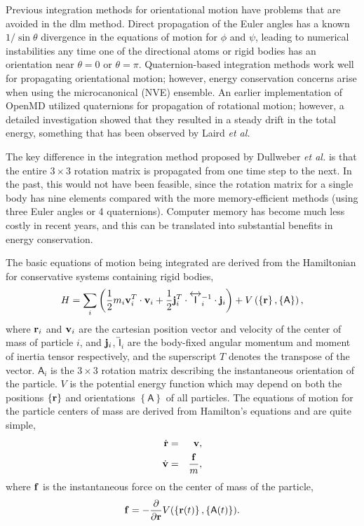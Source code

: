 \documentclass[]{book}
\begin{document}
Previous integration methods for orientational motion have problems
that are avoided in the {\sc dlm} method.  Direct propagation of the Euler
angles has a known $1/\sin\theta$ divergence in the equations of
motion for $\phi$ and $\psi$,\cite{Allen87} leading to numerical
instabilities any time one of the directional atoms or rigid bodies
has an orientation near $\theta=0$ or $\theta=\pi$.  Quaternion-based
integration methods work well for propagating orientational motion;
however, energy conservation concerns arise when using the
microcanonical (NVE) ensemble.  An earlier implementation of {\sc
OpenMD} utilized quaternions for propagation of rotational motion;
however, a detailed investigation showed that they resulted in a
steady drift in the total energy, something that has been observed by
Laird {\it et al.}\cite{Laird97}

The key difference in the integration method proposed by Dullweber
\emph{et al.} is that the entire $3 \times 3$ rotation matrix is
propagated from one time step to the next. In the past, this would not
have been feasible, since the rotation matrix for a single body has
nine elements compared with the more memory-efficient methods (using
three Euler angles or 4 quaternions).  Computer memory has become much
less costly in recent years, and this can be translated into
substantial benefits in energy conservation.

The basic equations of motion being integrated are derived from the
Hamiltonian for conservative systems containing rigid bodies,
\begin{equation}
H = \sum_{i} \left( \frac{1}{2} m_i {\bf v}_i^T \cdot {\bf v}_i +
\frac{1}{2} {\bf j}_i^T \cdot \overleftrightarrow{\mathsf{I}}_i^{-1} \cdot
{\bf j}_i \right) +
V\left(\left\{{\bf r}\right\}, \left\{\mathsf{A}\right\}\right),
\end{equation}
where ${\bf r}_i$ and ${\bf v}_i$ are the cartesian position vector
and velocity of the center of mass of particle $i$, and ${\bf j}_i$,
$\overleftrightarrow{\mathsf{I}}_i$ are the body-fixed angular
momentum and moment of inertia tensor respectively, and the
superscript $T$ denotes the transpose of the vector.  $\mathsf{A}_i$
is the $3 \times 3$ rotation matrix describing the instantaneous
orientation of the particle.  $V$ is the potential energy function
which may depend on both the positions $\left\{{\bf r}\right\}$ and
orientations $\left\{\mathsf{A}\right\}$ of all particles.  The
equations of motion for the particle centers of mass are derived from
Hamilton's equations and are quite simple,
\begin{eqnarray}
\dot{{\bf r}} & = & {\bf v}, \\
\dot{{\bf v}} & = & \frac{{\bf f}}{m},
\end{eqnarray}
where ${\bf f}$ is the instantaneous force on the center of mass
of the particle,
\begin{equation}
{\bf f} = - \frac{\partial}{\partial
{\bf r}} V(\left\{{\bf r}(t)\right\}, \left\{\mathsf{A}(t)\right\}).
\end{equation}
\end{document}
